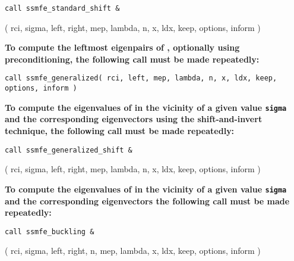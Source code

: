 \medskip
{\tt call
ssmfe\_standard\_shift \&

\hspace{8mm} 
( rci, sigma, left, right, mep, lambda, n, x, ldx, keep, options, inform )
}

\medskip
\noindent
{\bf
To compute %
the leftmost eigenpairs of ,
optionally using preconditioning,
the following call must be made repeatedly:
}

\medskip
{\tt call
ssmfe\_generalized( rci, left, mep, lambda, n, x, ldx, keep, options, inform )
}

\medskip
\noindent
{\bf
To compute the eigenvalues of  %
in the vicinity of 
a given value {\tt sigma}
and the corresponding eigenvectors using the shift-and-invert technique,
the following call must be made repeatedly:
}

\medskip
{\tt call
ssmfe\_generalized\_shift \&

\hspace{8mm} 
( rci, sigma, left, right, mep, lambda, n, x, ldx, keep, options, inform )
}

\medskip
\noindent
{\bf
To compute the eigenvalues of  %
in the vicinity of 
a given value {\tt sigma}
and the corresponding eigenvectors %
the following call must be made repeatedly:
}

\medskip
{\tt call
ssmfe\_buckling \&

\hspace{8mm} 
( rci, sigma, left, right, n, mep, lambda, x, ldx, keep, options, inform )
}


